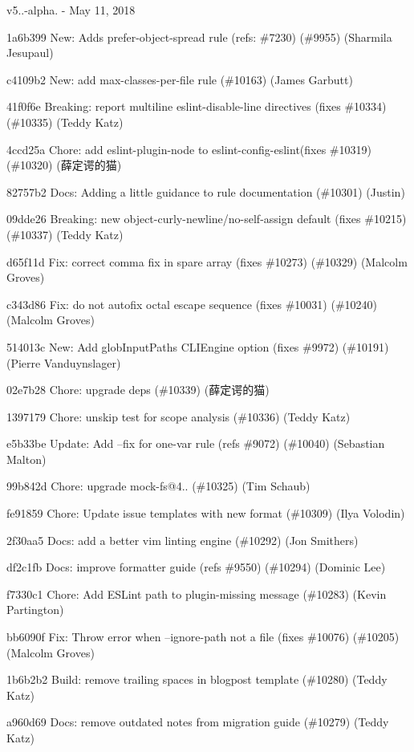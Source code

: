 v5..-\/alpha. -\/ May 11, 2018


\begin{DoxyItemize}
\item 1a6b399 New\+: Adds prefer-\/object-\/spread rule (refs\+: \#7230) (\#9955) (Sharmila Jesupaul)
\item c4109b2 New\+: add max-\/classes-\/per-\/file rule (\#10163) (James Garbutt)
\item 41f0f6e Breaking\+: report multiline eslint-\/disable-\/line directives (fixes \#10334) (\#10335) (Teddy Katz)
\item 4ccd25a Chore\+: add eslint-\/plugin-\/node to eslint-\/config-\/eslint(fixes \#10319) (\#10320) (薛定谔的猫)
\item 82757b2 Docs\+: Adding a little guidance to rule documentation (\#10301) (Justin)
\item 09dde26 Breaking\+: new object-\/curly-\/newline/no-\/self-\/assign default (fixes \#10215) (\#10337) (Teddy Katz)
\item d65f11d Fix\+: correct comma fix in spare array (fixes \#10273) (\#10329) (Malcolm Groves)
\item c343d86 Fix\+: do not autofix octal escape sequence (fixes \#10031) (\#10240) (Malcolm Groves)
\item 514013c New\+: Add {\ttfamily glob\+Input\+Paths} C\+L\+I\+Engine option (fixes \#9972) (\#10191) (Pierre Vanduynslager)
\item 02e7b28 Chore\+: upgrade deps (\#10339) (薛定谔的猫)
\item 1397179 Chore\+: unskip test for scope analysis (\#10336) (Teddy Katz)
\item e5b33be Update\+: Add --fix for one-\/var rule (refs \#9072) (\#10040) (Sebastian Malton)
\item 99b842d Chore\+: upgrade mock-\/fs@4.. (\#10325) (Tim Schaub)
\item fe91859 Chore\+: Update issue templates with new format (\#10309) (Ilya Volodin)
\item 2f30aa5 Docs\+: add a better vim linting engine (\#10292) (Jon Smithers)
\item df2c1fb Docs\+: improve formatter guide (refs \#9550) (\#10294) (Dominic Lee)
\item f7330c1 Chore\+: Add E\+S\+Lint path to plugin-\/missing message (\#10283) (Kevin Partington)
\item bb6090f Fix\+: Throw error when --ignore-\/path not a file (fixes \#10076) (\#10205) (Malcolm Groves)
\item 1b6b2b2 Build\+: remove trailing spaces in blogpost template (\#10280) (Teddy Katz)
\item a960d69 Docs\+: remove outdated notes from migration guide (\#10279) (Teddy Katz)
\end{DoxyItemize}

